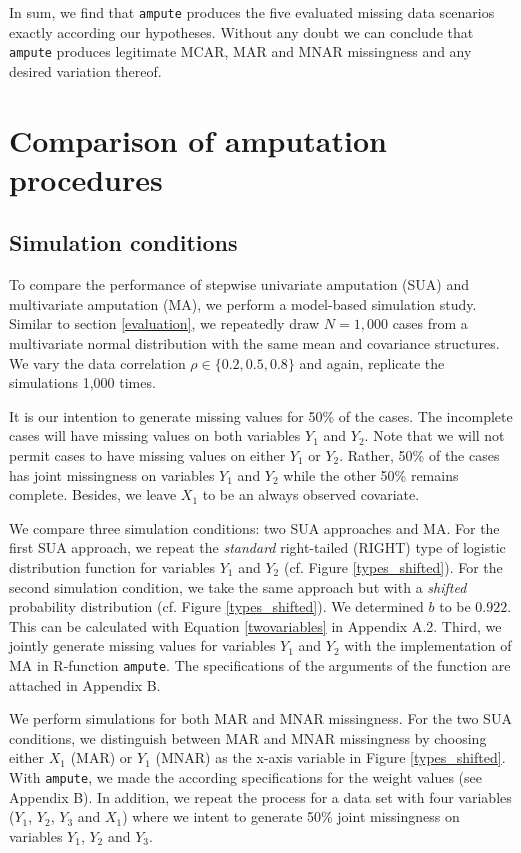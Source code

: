 \documentclass[11pt,a4paper]{article}
\newcommand{\code}[1]{\texttt{#1}}
\begin{document}
In sum, we find that \code{ampute} produces the five evaluated missing data scenarios exactly according our hypotheses. Without any doubt we can conclude that \code{ampute} produces legitimate MCAR, MAR and  MNAR missingness and any desired variation thereof. 

\section{Comparison of amputation procedures}\label{compare}

\subsection{\normalsize Simulation conditions}

To compare the performance of stepwise univariate amputation (SUA) and multivariate amputation (MA), we perform a model-based simulation study. Similar to section \ref{evaluation}, we repeatedly draw $N = 1,000$ cases from a multivariate normal distribution with the same mean and covariance structures. We vary the data correlation $\rho \in \{0.2, 0.5, 0.8\}$ and again, replicate the simulations 1,000 times. 

It is our intention to generate missing values for 50\% of the cases. The incomplete cases will have missing values on both variables $Y_1$ and $Y_2$. Note that we will not permit cases to have missing values on either $Y_1$ or $Y_2$. Rather, 50\% of the cases has joint missingness on variables $Y_1$ and $Y_2$ while the other 50\% remains complete. Besides, we leave $X_1$ to be an always observed covariate.

We compare three simulation conditions: two SUA approaches and MA. For the first SUA approach, we repeat the \textit{standard} right-tailed (RIGHT) type of logistic distribution function for variables $Y_1$ and $Y_2$ (cf. Figure \ref{types_shifted}). For the second simulation condition, we take the same approach but with a \textit{shifted} probability distribution (cf. Figure \ref{types_shifted}). We determined $b$ to be $0.922$. This can be calculated with Equation \eqref{twovariables} in Appendix A.2. Third, we jointly generate missing values for variables $Y_1$ and $Y_2$ with the implementation of MA in R-function \code{ampute}. The specifications of the arguments of the function are attached in Appendix B.

We perform simulations for both MAR and MNAR missingness. For the two SUA conditions, we distinguish between MAR and MNAR missingness by choosing either $X_1$ (MAR) or $Y_1$ (MNAR) as the x-axis variable in Figure \ref{types_shifted}. With \code{ampute}, we made the according specifications for the weight values (see Appendix B). In addition, we repeat the process for a data set with four variables ($Y_1$, $Y_2$, $Y_3$ and $X_1$) where we intent to generate 50\% joint missingness on variables $Y_1$, $Y_2$ and $Y_3$. 
\end{document}
